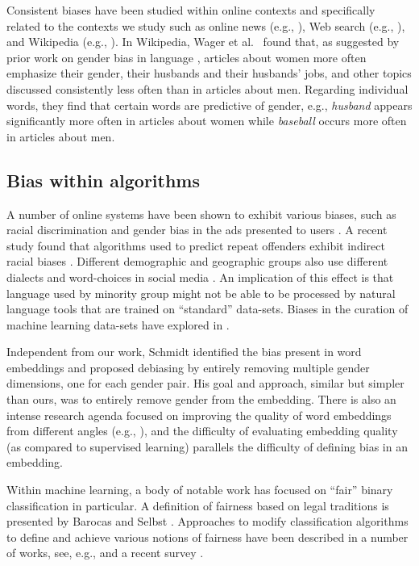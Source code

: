 \documentclass{article}
\begin{document}
Consistent biases have been studied within online contexts and specifically related to the contexts we study such as online news (e.g., \cite{ross2011women}), Web search (e.g., \cite{kay2015unequal}), and Wikipedia (e.g., \cite{wikipediaBias}). In Wikipedia, Wager et al.~\cite{wikipediaBias} found that, as suggested by prior work on gender bias in language \cite{finkbeiner2013}, articles about women more often emphasize their gender, their husbands and their husbands' jobs, and other topics discussed consistently less often than in articles about men. Regarding individual words, they find that certain words are predictive of gender, e.g.,  {\em husband} appears significantly more often in articles about women while {\em baseball} occurs more often in articles about men.  

\subsection{Bias within algorithms}
A number of online systems have been shown to exhibit various biases, such as racial discrimination and gender bias in the ads presented to users \cite{sweeney2013discrimination,datta2015automated}. A recent study found that algorithms used to predict repeat offenders exhibit indirect racial biases \cite{angwin2016}. Different demographic and geographic groups also use different dialects and word-choices in social media \cite{diffusionlexical}. An implication of this effect is that language used by minority group might not be able to be processed by natural language tools that are trained on ``standard'' data-sets. Biases in the curation of machine learning data-sets have explored in \cite{Torralba12,annotationbias}. 

Independent from our work, Schmidt \cite{schmidt2015} identified the bias present in word embeddings and proposed debiasing by entirely removing multiple gender dimensions, one for each gender pair. His goal and approach, similar but simpler than ours, was to entirely remove gender from the embedding. There is also an intense research agenda focused on improving the quality of word embeddings from different angles (e.g., \cite{levyGoldberg14,pennington2014glove,yogatamalearning,faruqui2015retrofitting}), and the difficulty of evaluating embedding quality (as compared to supervised learning) parallels  the difficulty of defining bias in an embedding.  

Within machine learning, a body of notable work has focused on ``fair'' binary classification in particular. A definition of fairness based on legal traditions is presented by Barocas and Selbst \cite{barocas2014big}. Approaches to modify classification algorithms to define and achieve various notions of fairness have been described in a number of works, see, e.g., \cite{barocas2014big, dwork2012fairness,feldman2015certifying} and a recent survey \cite{zliobaite2015survey}.
\end{document}
